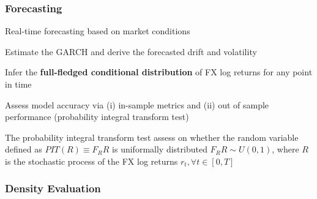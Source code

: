 \documentclass{beamer}
\newenvironment{largeitemize}{\itemize\addtolength{\itemsep}{10pt}}{\enditemize}
\begin{document}
\begin{frame}
  \frametitle{Forecasting}

  \begin{largeitemize}
      \item Real-time forecasting based on market conditions
    \item Estimate the GARCH and derive the forecasted drift and volatility
    \item Infer the \textbf{full-fledged conditional distribution} of FX log returns for any point
      in time
    \item Assess model accuracy via (i) in-sample metrics and (ii) out of
      sample performance (probability integral transform test)
    \item The probability integral transform test assess on whether the random
      variable defined as $PIT(R) \equiv F_{R}R$ is uniformally distributed
      $F_{R}R \sim U(0,1)$, where $R$ is the stochastic process of the FX log returns $r_t, \forall t \in
      [0, T]$
  \end{largeitemize}
  
\end{frame}


\begin{frame}
  \frametitle{Density Evaluation}
\end{frame}
\end{document}
